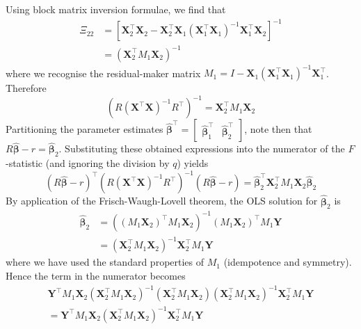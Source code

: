 \documentclass[11pt]{report} %
\begin{document}
Using block matrix inversion formulae, we find that
\begin{align}
\Xi_{22} &= \left[\mathbf{X}_{2}^{\top}\mathbf{X}_{2} - \mathbf{X}_{2}^{\top}\mathbf{X}_{1}\left(\mathbf{X}_{1}^{\top}\mathbf{X}_{1}\right)^{-1}\mathbf{X}_{1}^{\top}\mathbf{X}_{2}\right]^{-1} \\
&= \left(\mathbf{X}_{2}^{\top}M_{1}\mathbf{X}_{2}\right)^{-1}
\end{align}
where we recognise the residual-maker matrix $M_{1} = I - \mathbf{X}_{1}\left(\mathbf{X}_{1}^{\top}\mathbf{X}_{1}\right)^{-1}\mathbf{X}_{1}^{\top}$. Therefore
\begin{equation}
\left(R\left(\mathbf{X}^{\top}\mathbf{X}\right)^{-1}R^{\top}\right)^{-1} = \mathbf{X}_{2}^{\top}M_{1}\mathbf{X}_{2}
\end{equation}
Partitioning the parameter estimates $\widehat{\boldsymbol{\beta}}^{\top} = \begin{bmatrix} \widehat{\boldsymbol{\beta}}_{1}^{\top} & \widehat{\boldsymbol{\beta}}_{2}^{\top}\end{bmatrix}$, note then that $R\widehat{\boldsymbol{\beta}} - r = \widehat{\boldsymbol{\beta}}_{2}$. Substituting these obtained expressions into the numerator of the $F$-statistic (and ignoring the division by $q$) yields
\begin{equation}
\left(R\widehat{\boldsymbol{\beta}} - r\right)^{\top}\left(R\left(\mathbf{X}^{\top}\mathbf{X}\right)^{-1}R^{\top}\right)^{-1}\left(R\widehat{\boldsymbol{\beta}} - r\right) = \widehat{\boldsymbol{\beta}}_{2}^{\top}\mathbf{X}_{2}^{\top}M_{1}\mathbf{X}_{2}\widehat{\boldsymbol{\beta}}_{2}
\end{equation}
By application of the Frisch-Waugh-Lovell theorem, the OLS solution for $\widehat{\boldsymbol{\beta}}_{2}$ is
\begin{align}
\widehat{\boldsymbol{\beta}}_{2} &= \left(\left(M_{1}\mathbf{X}_{2}\right)^{\top}M_{1}\mathbf{X}_{2}\right)^{-1}\left(M_{1}\mathbf{X}_{2}\right)^{\top}M_{1}\mathbf{Y} \\
&= \left(\mathbf{X}_{2}^{\top}M_{1}\mathbf{X}_{2}\right)^{-1}\mathbf{X}_{2}^{\top}M_{1}\mathbf{Y}
\end{align}
where we have used the standard properties of $M_{1}$ (idempotence and symmetry). Hence the term in the numerator becomes
\begin{multline}
\mathbf{Y}^{\top}M_{1}\mathbf{X}_{2}\left(\mathbf{X}_{2}^{\top}M_{1}\mathbf{X}_{2}\right)^{-1}\left(\mathbf{X}_{2}^{\top}M_{1}\mathbf{X}_{2}\right)\left(\mathbf{X}_{2}^{\top}M_{1}\mathbf{X}_{2}\right)^{-1}\mathbf{X}_{2}^{\top}M_{1}\mathbf{Y} \\
= \mathbf{Y}^{\top}M_{1}\mathbf{X}_{2}\left(\mathbf{X}_{2}^{\top}M_{1}\mathbf{X}_{2}\right)^{-1}\mathbf{X}_{2}^{\top}M_{1}\mathbf{Y}
\end{multline}
\end{document}
